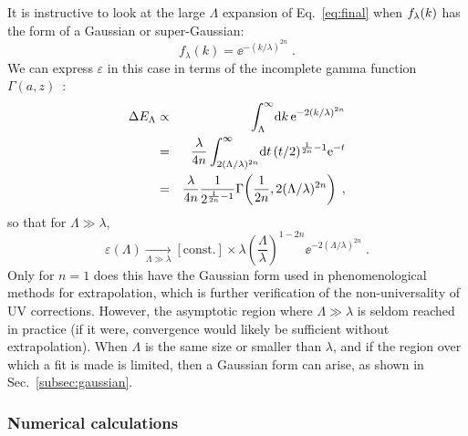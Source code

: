 	It is instructive to look at the large $\Lambda$ expansion of
	Eq.~\eqref{eq:final} when $f_{\lambda}(k)$ has the form of a Gaussian or
	super-Gaussian:
	\begin{equation}
	  f_\lambda(k) = \ee^{-(k/\lambda)^{2n}}
	  \;.
	\end{equation}
	We can express $\varepsilon$ in this case in terms of the incomplete
	gamma function $\Gamma(a,z)$~\cite{Olver:2010:NHMF}:
	\begin{eqnarray}
	  \Delta E_{\Lambda} &\propto& \int_{\Lambda}^{\infty}\! \mathrm{d}
	k\,\mathrm{e}^{-2(k/\lambda)^{2n}}
	     \nonumber \\
	  &=& \frac{\lambda}{4n}\int_{2(\Lambda/\lambda)^{2n}}^\infty \! \mathrm{d} t\,
	     (t/2)^{\frac{1}{2n} - 1} \mathrm{e}^{-t}
	     \nonumber \\
	  &=& \frac{\lambda}{4n}\frac{1}{2^{\frac{1}{2n} - 1}}
	  \Gamma\!\left(\frac{1}{2n},2(\Lambda/\lambda)^{2n}\right)
	  \;,
	\end{eqnarray}
	so that for $\Lambda \gg \lambda$,
	\begin{equation}
	  \varepsilon(\Lambda) \underset{\Lambda\gg\lambda}{\longrightarrow}
	   [\mbox{const.}] \times \lambda
	   \left(\frac{\Lambda}{\lambda}\right)^{1-2n} \ee^{-2(\Lambda/\lambda)^{2n}}
	   \;.
	\end{equation}
	Only for $n=1$ does this have the Gaussian form used in
	phenomenological methods for extrapolation, which is further
	verification of the non-universality of UV corrections.  However, the
	asymptotic region where $\Lambda \gg \lambda$ is seldom reached in
	practice (if it were, convergence would likely be sufficient without
	extrapolation).  When $\Lambda$ is the same size or smaller than
	$\lambda$, and if the region over which a fit is made is limited, then a
	Gaussian form can arise, as shown in Sec.~\ref{subsec:gaussian}.

	\medskip
	\subsubsection{Numerical calculations}

